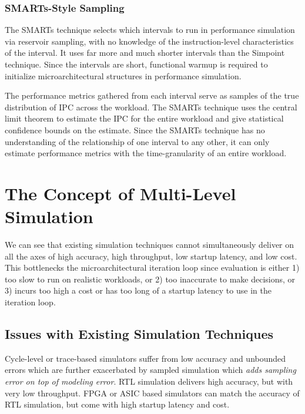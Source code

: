 \documentclass[sigplan,nonacm,10pt]{acmart}
\begin{document}
\subsubsection{SMARTs-Style Sampling}

The SMARTs technique selects which intervals to run in performance simulation via reservoir sampling, with no knowledge of the instruction-level characteristics of the interval.
It uses far more and much shorter intervals than the Simpoint technique.
Since the intervals are short, functional warmup is required to initialize microarchitectural structures in performance simulation.

The performance metrics gathered from each interval serve as samples of the true distribution of IPC across the workload.
The SMARTs technique uses the central limit theorem to estimate the IPC for the entire workload and give statistical confidence bounds on the estimate.
Since the SMARTs technique has no understanding of the relationship of one interval to any other, it can only estimate performance metrics with the time-granularity of an entire workload.

\section{The Concept of Multi-Level Simulation}


We can see that existing simulation techniques cannot simultaneously deliver on all the axes of high accuracy, high throughput, low startup latency, and low cost.
This bottlenecks the microarchitectural iteration loop since evaluation is either 1) too slow to run on realistic workloads, or 2) too inaccurate to make decisions, or 3) incurs too high a cost or has too long of a startup latency to use in the iteration loop.

\subsection{Issues with Existing Simulation Techniques}


Cycle-level or trace-based simulators suffer from low accuracy and unbounded errors which are further exacerbated by sampled simulation which \textit{adds sampling error on top of modeling error}.
RTL simulation delivers high accuracy, but with very low throughput.
FPGA or ASIC based simulators can match the accuracy of RTL simulation, but come with high startup latency and cost.
\end{document}
